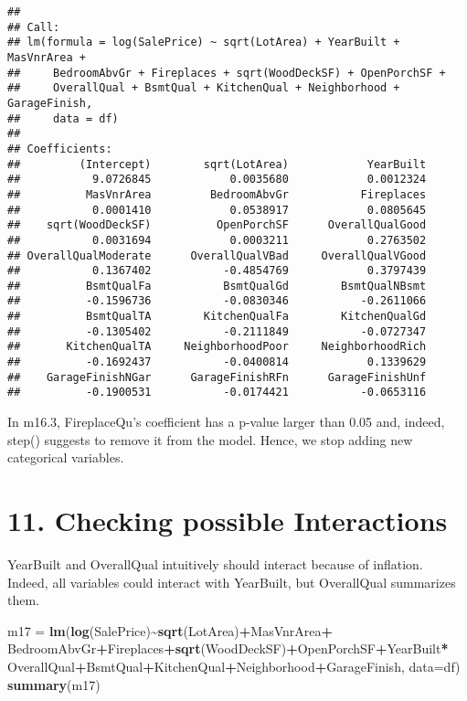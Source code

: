 \documentclass[
]{article}
\newenvironment{Shaded}{\begin{snugshade}}{\end{snugshade}}
\newcommand{\AttributeTok}[1]{\textcolor[rgb]{0.13,0.29,0.53}{#1}}
\newcommand{\FunctionTok}[1]{\textcolor[rgb]{0.13,0.29,0.53}{\textbf{#1}}}
\newcommand{\NormalTok}[1]{#1}
\newcommand{\OtherTok}[1]{\textcolor[rgb]{0.56,0.35,0.01}{#1}}
\newcommand{\SpecialCharTok}[1]{\textcolor[rgb]{0.81,0.36,0.00}{\textbf{#1}}}
\begin{document}
\begin{verbatim}
## 
## Call:
## lm(formula = log(SalePrice) ~ sqrt(LotArea) + YearBuilt + MasVnrArea + 
##     BedroomAbvGr + Fireplaces + sqrt(WoodDeckSF) + OpenPorchSF + 
##     OverallQual + BsmtQual + KitchenQual + Neighborhood + GarageFinish, 
##     data = df)
## 
## Coefficients:
##         (Intercept)        sqrt(LotArea)            YearBuilt  
##           9.0726845            0.0035680            0.0012324  
##          MasVnrArea         BedroomAbvGr           Fireplaces  
##           0.0001410            0.0538917            0.0805645  
##    sqrt(WoodDeckSF)          OpenPorchSF      OverallQualGood  
##           0.0031694            0.0003211            0.2763502  
## OverallQualModerate      OverallQualVBad     OverallQualVGood  
##           0.1367402           -0.4854769            0.3797439  
##          BsmtQualFa           BsmtQualGd        BsmtQualNBsmt  
##          -0.1596736           -0.0830346           -0.2611066  
##          BsmtQualTA        KitchenQualFa        KitchenQualGd  
##          -0.1305402           -0.2111849           -0.0727347  
##       KitchenQualTA     NeighborhoodPoor     NeighborhoodRich  
##          -0.1692437           -0.0400814            0.1339629  
##    GarageFinishNGar      GarageFinishRFn      GarageFinishUnf  
##          -0.1900531           -0.0174421           -0.0653116
\end{verbatim}

In m16.3, FireplaceQu's coefficient has a p-value larger than 0.05 and,
indeed, step() suggests to remove it from the model. Hence, we stop
adding new categorical variables.

\hypertarget{checking-possible-interactions}{%
\section{11. Checking possible
Interactions}\label{checking-possible-interactions}}

YearBuilt and OverallQual intuitively should interact because of
inflation. Indeed, all variables could interact with YearBuilt, but
OverallQual summarizes them.

\begin{Shaded}
\begin{Highlighting}[]
\NormalTok{m17 }\OtherTok{=} \FunctionTok{lm}\NormalTok{(}\FunctionTok{log}\NormalTok{(SalePrice)}\SpecialCharTok{\textasciitilde{}}\FunctionTok{sqrt}\NormalTok{(LotArea)}\SpecialCharTok{+}\NormalTok{MasVnrArea}\SpecialCharTok{+}
\NormalTok{          BedroomAbvGr}\SpecialCharTok{+}\NormalTok{Fireplaces}\SpecialCharTok{+}\FunctionTok{sqrt}\NormalTok{(WoodDeckSF)}\SpecialCharTok{+}\NormalTok{OpenPorchSF}\SpecialCharTok{+}\NormalTok{YearBuilt}\SpecialCharTok{*}
\NormalTok{           OverallQual}\SpecialCharTok{+}\NormalTok{BsmtQual}\SpecialCharTok{+}\NormalTok{KitchenQual}\SpecialCharTok{+}\NormalTok{Neighborhood}\SpecialCharTok{+}\NormalTok{GarageFinish, }\AttributeTok{data=}\NormalTok{df)}
\FunctionTok{summary}\NormalTok{(m17)}
\end{Highlighting}
\end{Shaded}
\end{document}
